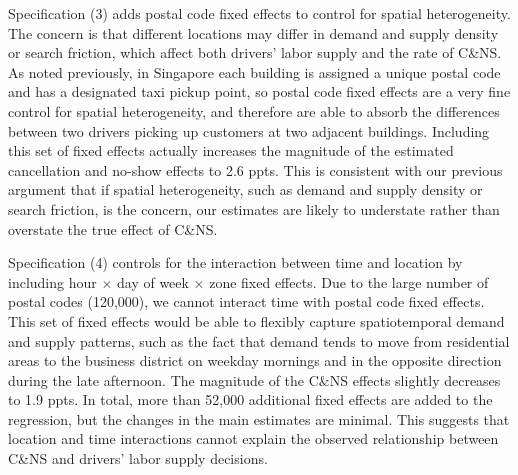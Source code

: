 \documentclass[reviewmode,AEJ]{AEA}
\begin{document}
Specification (3) adds postal code fixed effects to control for spatial heterogeneity. The concern is that 
different locations may differ in demand and supply density or search friction, which affect both drivers' 
labor supply and the rate of C\&NS. As noted previously, in Singapore each building is assigned a unique postal 
code and has a designated taxi pickup point, so postal code fixed effects are a very fine control for spatial
heterogeneity, and therefore are able to absorb the differences between two drivers picking up customers at 
two adjacent buildings. Including this set of fixed effects actually increases the magnitude of the estimated 
cancellation and no-show effects to 2.6 ppts. This is consistent with our previous argument that if spatial 
heterogeneity, such as demand and supply density or search friction, is the concern, our estimates are likely 
to understate rather than overstate the true effect of C\&NS.

Specification (4) controls for the interaction between time and location by including hour $\times$ day of
week $\times$ zone fixed effects. Due to the large number of postal codes (120,000), we cannot interact time 
with postal code fixed effects. 
This set of fixed effects would be able to flexibly capture spatiotemporal demand and supply patterns, such 
as the fact that demand tends to move from residential areas to the business district on weekday mornings and
in the opposite direction during the late afternoon. The magnitude of the C\&NS effects slightly decreases
to 1.9 ppts. In total, more than 52,000 additional fixed effects are added to the regression, but the changes
in the main estimates are minimal. This suggests that location and time interactions cannot explain the 
observed relationship between C\&NS and drivers' labor supply decisions.
\end{document}
